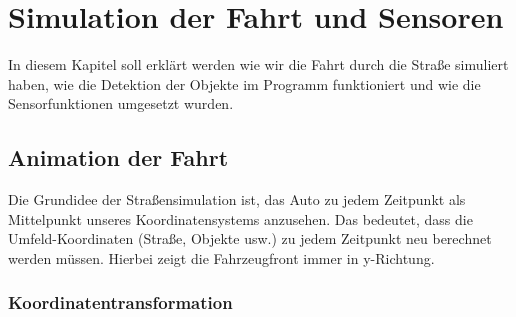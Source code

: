 \chapter{Simulation der Fahrt und Sensoren}

In diesem Kapitel soll erklärt werden wie wir die Fahrt durch die Straße simuliert haben, wie die Detektion der Objekte im Programm funktioniert und wie die Sensorfunktionen umgesetzt wurden.

\section{Animation der Fahrt}

Die Grundidee der Straßensimulation ist, das Auto zu jedem Zeitpunkt als Mittelpunkt unseres Koordinatensystems anzusehen. Das bedeutet, dass die Umfeld-Koordinaten (Straße, Objekte usw.)  zu jedem Zeitpunkt neu berechnet werden müssen. Hierbei zeigt die Fahrzeugfront immer in y-Richtung.

\subsection{Koordinatentransformation}





